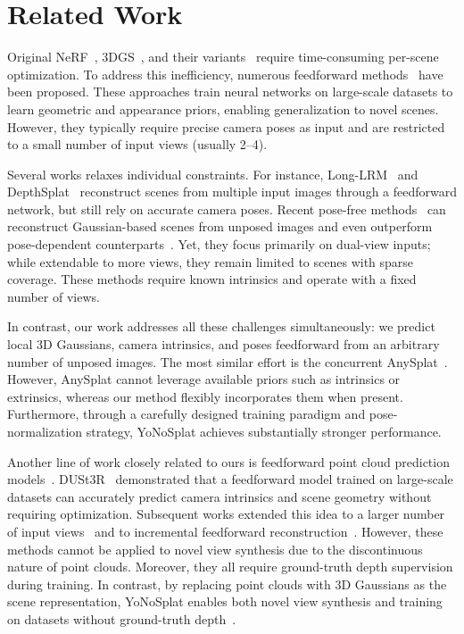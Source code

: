 \vspace{-1mm}
\section{Related Work}
\vspace{-1mm}

Original NeRF~\citep{nerf}, 3DGS~\citep{3dgs}, and their variants~\citep{instant-ngp, Mip-nerf, ye2023self} require time-consuming per-scene optimization.  
To address this inefficiency, numerous feedforward methods~\citep{pixelnerf, lrm, gslrm, pixelsplat, mvsplat} have been proposed. These approaches train neural networks on large-scale datasets to learn geometric and appearance priors, enabling generalization to novel scenes. However, they typically require precise camera poses as input and are restricted to a small number of input views (usually 2–4).  

Several works relaxes individual constraints. For instance, Long-LRM~\citep{llrm} and DepthSplat~\citep{depthsplat} reconstruct scenes from multiple input images through a feedforward network, but still rely on accurate camera poses. Recent pose-free methods~\citep{noposplat, flare} can reconstruct Gaussian-based scenes from unposed images and even outperform pose-dependent counterparts~\citep{pixelsplat, mvsplat}. Yet, they focus primarily on dual-view inputs; while extendable to more views, they remain limited to scenes with sparse coverage. These methods require known intrinsics and operate with a fixed number of views.  

In contrast, our work addresses all these challenges simultaneously: we predict local 3D Gaussians, camera intrinsics, and poses feedforward from an arbitrary number of unposed images. The most similar effort is the concurrent AnySplat~\citep{anysplat}. However, AnySplat cannot leverage available priors such as intrinsics or extrinsics, whereas our method flexibly incorporates them when present. Furthermore, through a carefully designed training paradigm and pose-normalization strategy, YoNoSplat achieves substantially stronger performance.  


Another line of work closely related to ours is feedforward point cloud prediction models~\citep{dust3r, vggt, pi3}. DUSt3R~\citep{dust3r} demonstrated that a feedforward model trained on large-scale datasets can accurately predict camera intrinsics and scene geometry without requiring optimization. Subsequent works extended this idea to a larger number of input views~\citep{vggt, fast3r, pi3} and to incremental feedforward reconstruction~\citep{cut3r}. However, these methods cannot be applied to novel view synthesis due to the discontinuous nature of point clouds. Moreover, they all require ground-truth depth supervision during training. In contrast, by replacing point clouds with 3D Gaussians as the scene representation, YoNoSplat enables both novel view synthesis and training on datasets without ground-truth depth~\citep{dl3dv, re10k}.

